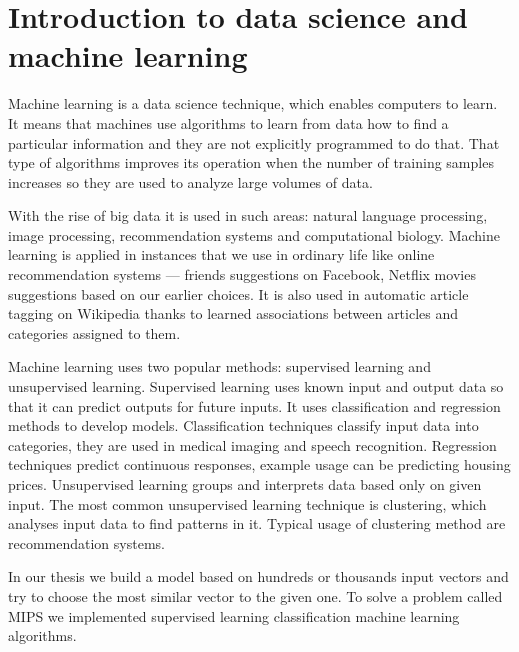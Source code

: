 \section{Introduction to data science and machine learning}

Machine learning is a data science technique, which enables computers to learn.
It means that machines use algorithms to learn from data how to find a particular information and
they are not explicitly programmed to do that.
That type of algorithms improves its operation when the number of training samples increases so they are used to analyze large volumes of data.

With the rise of big data it is used in such areas: natural language processing, image processing, recommendation systems and computational biology. Machine learning is applied in instances that we use in ordinary life like online recommendation systems --- friends suggestions on Facebook, Netflix movies suggestions based on our earlier choices.
It is also used in automatic article tagging on Wikipedia thanks to learned
associations between articles and categories assigned to them.

Machine learning uses two popular methods: supervised learning and unsupervised learning.
Supervised learning uses known input and output data so that it can predict outputs for future inputs.
It uses classification and regression methods to develop models.
Classification techniques classify input data into categories, they are used in medical imaging and speech recognition.
Regression techniques predict continuous responses, example usage can be predicting housing prices. Unsupervised learning groups and interprets data based only on given input.
The most common unsupervised learning technique is clustering,
which analyses input data to find patterns in it. 
Typical usage of clustering method are recommendation systems.

In our thesis we build a model based on hundreds or thousands input vectors and try to choose the most similar vector to the given one. 
To solve a problem called MIPS we implemented supervised learning classification machine learning algorithms.
